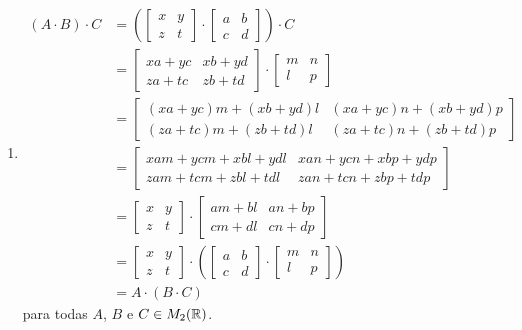 \documentclass[12pt]{exam}
\begin{document}
\begin{enumerate}[label={\roman*})]
    \item
    \begin{align*}
        (A\cdot B)\cdot C &= \left(\begin{bmatrix}
        x & y\\z & t 
    \end{bmatrix} \cdot \begin{bmatrix}
        a & b\\c & d 
    \end{bmatrix}\right) \cdot C\\ &= \begin{bmatrix}
        xa + yc & xb + yd\\za + tc & zb + td 
    \end{bmatrix} \cdot \begin{bmatrix}
        m & n\\
        l & p
    \end{bmatrix}\\ &= \begin{bmatrix}
        (xa + yc)m + (xb + yd)l & (xa + yc)n + (xb + yd)p\\
        (za + tc)m + (zb + td)l & (za + tc)n + (zb + td)p
    \end{bmatrix}\\ &= \begin{bmatrix}
        xam + ycm + xbl + ydl & xan + ycn + xbp + ydp\\
        zam + tcm + zbl + tdl & zan + tcn + zbp + tdp
    \end{bmatrix}\\ &= \begin{bmatrix}
        x & y\\z & t 
    \end{bmatrix} \cdot \begin{bmatrix}
        am + bl & an + bp\\cm + dl & cn + dp 
    \end{bmatrix}\\ &= \begin{bmatrix}
        x & y\\z & t 
    \end{bmatrix} \cdot \left(\begin{bmatrix}
        a & b\\
        c & d
    \end{bmatrix}\cdot \begin{bmatrix}
        m & n\\
        l & p
    \end{bmatrix}\right)\\ &= A\cdot (B \cdot C)
    \end{align*}
    para todas $A$, $B$ e $C \in M_2(\mathbb{R})$.


\end{enumerate}
\end{document}
